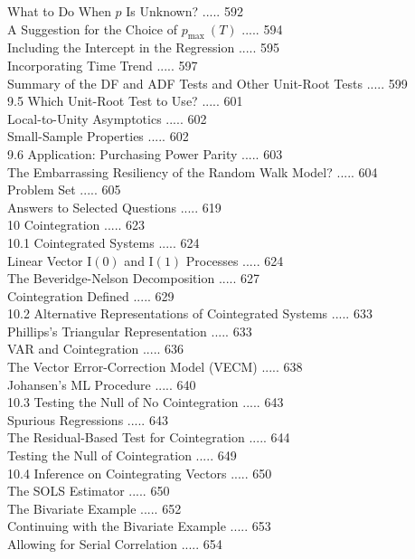 \documentclass[10pt]{article}
\begin{document}
What to Do When $p$ Is Unknown? ..... 592\\
A Suggestion for the Choice of $p_{\text {max }}(T)$ ..... 594\\
Including the Intercept in the Regression ..... 595\\
Incorporating Time Trend ..... 597\\
Summary of the DF and ADF Tests and Other Unit-Root Tests ..... 599\\
9.5 Which Unit-Root Test to Use? ..... 601\\
Local-to-Unity Asymptotics ..... 602\\
Small-Sample Properties ..... 602\\
9.6 Application: Purchasing Power Parity ..... 603\\
The Embarrassing Resiliency of the Random Walk Model? ..... 604\\
Problem Set ..... 605\\
Answers to Selected Questions ..... 619\\
10 Cointegration ..... 623\\
10.1 Cointegrated Systems ..... 624\\
Linear Vector $\mathrm{I}(0)$ and $\mathrm{I}(1)$ Processes ..... 624\\
The Beveridge-Nelson Decomposition ..... 627\\
Cointegration Defined ..... 629\\
10.2 Alternative Representations of Cointegrated Systems ..... 633\\
Phillips's Triangular Representation ..... 633\\
VAR and Cointegration ..... 636\\
The Vector Error-Correction Model (VECM) ..... 638\\
Johansen's ML Procedure ..... 640\\
10.3 Testing the Null of No Cointegration ..... 643\\
Spurious Regressions ..... 643\\
The Residual-Based Test for Cointegration ..... 644\\
Testing the Null of Cointegration ..... 649\\
10.4 Inference on Cointegrating Vectors ..... 650\\
The SOLS Estimator ..... 650\\
The Bivariate Example ..... 652\\
Continuing with the Bivariate Example ..... 653\\
Allowing for Serial Correlation ..... 654\\
\end{document}
